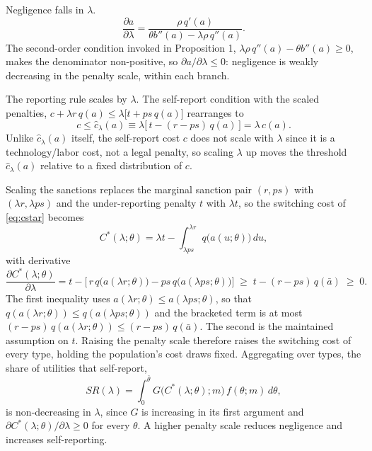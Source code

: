 \documentclass[12pt]{article}
\begin{document}
	Negligence falls in $\lambda$.
	\[
	\frac{\partial a}{\partial \lambda} = \frac{\rho\,q'(a)}{\theta b''(a) - \lambda \rho\, q''(a)}.
	\]
	The second-order condition invoked in Proposition 1, $\lambda \rho\,q''(a) - \theta b''(a) \ge 0$, makes the denominator non-positive, so $\partial a/\partial\lambda \le 0$: negligence is weakly decreasing in the penalty scale, within each branch.
	
	The reporting rule scales by $\lambda$. The self-report condition with the scaled penalties, $c + \lambda r\,q(a) \le \lambda\big[t+ps\,q(a)\big]$ rearranges to
	\begin{equation}\label{eq:chat_lambda}
		c \le \hat{c}_\lambda(a) \equiv \lambda\big[\,t - (r-ps)\,q(a)\,\big] = \lambda\,\hat{c}(a).
	\end{equation}
	Unlike $\hat{c}_\lambda(a)$ itself, the self-report cost $c$ does not scale with $\lambda$ since it is a technology/labor cost, not a legal penalty, so scaling $\lambda$ up moves the threshold $\hat{c}_\lambda(a)$ relative to a fixed distribution of $c$.
	
	Scaling the sanctions replaces the marginal sanction pair $(r, ps)$ with $(\lambda r, \lambda ps)$ and the under-reporting penalty $t$ with $\lambda t$, so the switching cost of \eqref{eq:cstar} becomes
	\[
	C^*(\lambda;\theta) = \lambda t - \int_{\lambda ps}^{\lambda r} q\big(a(u;\theta)\big)\, du,
	\]
	with derivative
	\[
	\frac{\partial C^*(\lambda;\theta)}{\partial \lambda} = t - \Big[\, r\, q\big(a(\lambda r;\theta)\big) - ps\, q\big(a(\lambda ps;\theta)\big) \Big] \;\ge\; t - (r-ps)\, q(\bar{a}) \;\ge\; 0.
	\]
	The first inequality uses $a(\lambda r;\theta) \le a(\lambda ps;\theta)$, so that $q(a(\lambda r;\theta)) \le q(a(\lambda ps;\theta))$ and the bracketed term is at most $(r-ps)\,q(a(\lambda r;\theta)) \le (r-ps)\,q(\bar{a})$. The second is the maintained assumption on $t$. Raising the penalty scale therefore raises the switching cost of every type, holding the population's cost draws fixed. Aggregating over types, the share of utilities that self-report,
	\[
	SR(\lambda) = \int_0^{\bar\theta} G\big(C^*(\lambda;\theta);m\big)\, f(\theta;m)\, d\theta,
	\]
	is non-decreasing in $\lambda$, since $G$ is increasing in its first argument and $\partial C^*(\lambda;\theta)/\partial\lambda \ge 0$ for every $\theta$. A higher penalty scale reduces negligence and increases self-reporting.


\begingroup
\let\tiny\footnotesize
\let\scriptsize\footnotesize
\let\small\normalsize
\end{document}
